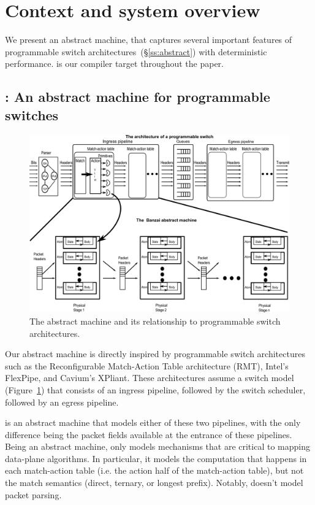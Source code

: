 \section{Context and system overview}

We present an abstract machine, \textit{\absmachine} that captures several
important features of programmable switch architectures~(\S\ref{ss:abstract})
with deterministic performance. \absmachine is our compiler target throughout
the paper.

\subsection{\absmachine: An abstract machine for programmable switches}
\begin{figure}[!t]
  \includegraphics[width=\textwidth]{banzai.pdf}
  \caption{The \absmachine abstract machine and its relationship to programmable switch architectures.}
  \label{fig:switch}
\end{figure}
Our abstract machine is directly inspired by programmable switch architectures
such as the Reconfigurable Match-Action Table architecture (RMT), Intel's
FlexPipe, and Cavium's XPliant. These architectures assume a switch model
(Figure~\ref{fig:switch}) that consists of an ingress pipeline, followed by the
switch scheduler, followed by an egress pipeline.

\absmachine is an abstract machine that models either of these two pipelines, with
the only difference being the packet fields available at the entrance of these
pipelines. Being an abstract machine, \absmachine only models mechanisms that are
critical to mapping data-plane algorithms. In particular, it models the
computation that happens in each match-action table (i.e. the action half of
the match-action table), but not the match semantics (direct, ternary, or longest
prefix). Notably, \absmachine doesn't model packet parsing.

